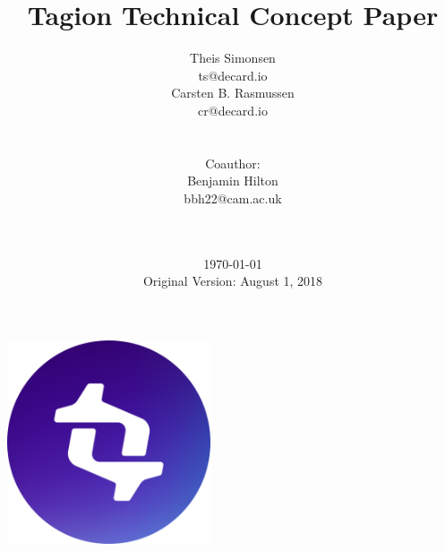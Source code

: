 \title{Tagion Technical Concept Paper}
\date{\today \\[4mm] Original Version: August 1, 2018}
\author{
  \begin{minipage}{0.3\textwidth}
    \centering
    Theis Simonsen \\
    ts@decard.io
  \end{minipage}
  \hspace{0\textwidth}
  \begin{minipage}{0.3\textwidth}
    \centering
    Carsten B. Rasmussen \\
    cr@decard.io
  \end{minipage}\\[5mm]
  \begin{minipage}{\textwidth}
    \centering
    \small Coauthor: \\
    \small Benjamin Hilton \\
    \small bbh22@cam.ac.uk \\[3ex]
  \end{minipage}\\[5mm]
}
\maketitle
\begin{center}
\includegraphics[width = 60mm]{figures/logo.png} \\[3mm]
\end{center}